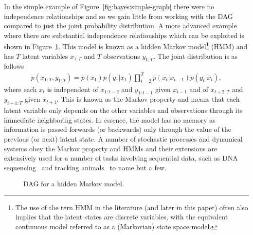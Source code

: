 In the simple example of Figure~\ref{fig:bayes:simple-graph} there were no independence relationships and so
we gain little from working with the DAG compared to just the joint probability distribution.
A more advanced example where there are substantial independence relationships which can
be exploited is shown in Figure~\ref{fig:bayes:hmm}.
  This model is known as a hidden Markov 
model\footnote{The use of the tern HMM in the literature (and later in this paper) often also implies that
	the latent states are discrete variables, with the equivalent continuous model referred to as a
	(Markovian) state space model.} (HMM)
and has $T$ latent variables $x_{1:T}$ and $T$ observations $y_{1:T}$.  The joint distribution is as follows
\begin{align}
\label{eq:bayes:hmm}
p(x_{1:T},y_{1:T}) = p(x_1) p(y_1|x_1)\prod_{t=2}^{T} p(x_t|x_{t-1})p(y_t|x_t),
\end{align}
where each $x_t$ is
independent of $x_{1:{t-2}}$ and $y_{1:t-1}$ given $x_{t-1}$ and of $x_{t+2:T}$ and $y_{{t+1}:T}$ given $x_{t+1}$.
This is known as the Markov property and means that each latent variable only depends on the other
variables and observations through its immediate neighboring states.  In essence, the model has no memory as information
is passed forwards (or backwards) only through the value of the previous (or next) latent state.  A number of stochastic
processes and dynamical systems obey the Markov property and HMMs and their extensions are extensively used for
a number of tasks involving sequential data, such as DNA sequencing~\citep{durbin1998biological} and tracking
animals~\citep{dhir2016tracking,dhir2017interpreting} to name but a few. 

\begin{figure}[t]
	\centering 
	
	\caption{DAG for a hidden Markov model.
		\label{fig:bayes:hmm}}
\end{figure}

